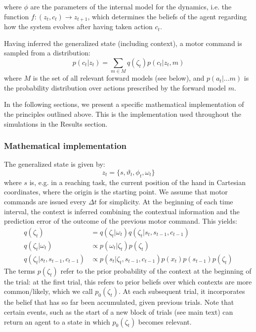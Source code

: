 \documentclass[a4paper,doc,floatsintext,natbib]{apa6}
\begin{document}
where $\phi$ are the parameters of the internal model for the dynamics,
i.e. the function $f: (z_t, c_t) \rightarrow z_{t+1}$, which determines the beliefs of
the agent regarding how the system evolves after having taken action $c_t$.

Having inferred the generalized state (including context), a motor command is
sampled from a distribution:
\begin{equation}
p(c_t | z_t) = \displaystyle\sum_{m \in M}q(\zeta_t)p(c_t | z_t, m)
\end{equation}
where $M$ is the set of all relevant forward models (see below), and
$p(a_t | ... m)$ is the probability distribution over actions prescribed by the
forward model $m$.

In the following sections, we present a specific mathematical implementation
of the principles outlined above. This is the implementation used throughout the
simulations in the Results section.

\subsubsection{Mathematical implementation}
The generalized state is given by:
\begin{equation}
z_t = \{s, \vartheta_t, \phi_t, \omega_t\}
\end{equation}
where $s$ is, e.g. in a reaching task, the current position of the hand in
Cartesian coordinates, where the origin is the starting point. We assume that
motor commands are issued every $\Delta t$ for simplicity. At the beginning of
each time interval, the context is inferred combining the contextual
information and the prediction error of the outcome of the previous motor
command. This yields:
\begin{align}
  q(\zeta_t) &= q(\zeta_t | \omega_t)q(\zeta_t | s_t, s_{t-1}, c_{t-1}) \\ \label{eqn:estimated-context}
  q(\zeta_t | \omega_t) &\propto p(\omega_t | \zeta_t)p(\zeta_t) \\
  q(\zeta_t | s_t, s_{t-1}, c_{t-1}) &\propto p(s_t | \zeta_t, s_{t-1}, c_{t-1})p(x_t)p(s_{t-1})p(\zeta_t)
\end{align}
The terms $p(\zeta_t)$ refer to the prior probability of the context at the
beginning of the trial: at the first trial, this refers to prior beliefs over
which contexts are more common/likely, which we call $p_0(\zeta_t)$. At each
subsequent trial, it incorporates the belief that has so far been accumulated,
given previous trials. Note that certain events, such as the start of a new
block of trials (see main text) can return an agent to a state in which
$p_0(\zeta_t)$ becomes relevant.
\end{document}
